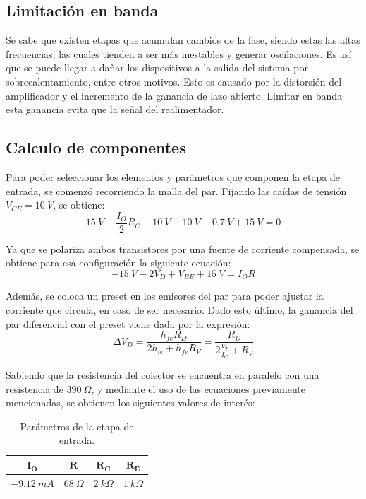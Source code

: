 \subsection{Limitación en banda}
Se sabe que  existen etapas que acumulan cambios de la fase, siendo estas las altas frecuencias, las cuales tienden a ser más inestables y generar oscilaciones. Es así que se puede llegar a dañar los dispositivos a la salida del sistema por sobrecalentamiento, entre otros motivos. Esto es causado por la distorsión del amplificador y el incremento de la ganancia de lazo abierto. Limitar en banda esta ganancia evita que la señal del realimentador.

\subsection{Calculo de componentes}
Para poder seleccionar los elementos y parámetros que componen la etapa de entrada, se comenzó recorriendo la malla del par. Fijando las caídas de tensión $V_{CE} = 10 \ V$, se obtiene:
\begin{equation}
	15 \ V - \frac{I_O}{2} R_C - 10 \ V - 10 \ V - 0.7 \ V + 15 \ V = 0
\end{equation}

Ya que se polariza ambos transistores por una fuente de corriente compensada, se obtiene para esa configuración la siguiente ecuación:
\begin{equation}
	-15 \ V - 2V_{D} + V_{BE} + 15 \ V = I_O R 
\end{equation}

Además, se coloca un preset en los emisores del par para poder ajustar la corriente que circula, en caso de ser necesario. Dado esto último, la ganancia del par diferencial con el preset viene dada por la expresión:
\begin{equation}
	\Delta V_D = \frac{h_{fe} R_D}{2 h_{ie} + h_{fe} R_V} = \frac{R_D}{2 \frac{V_T}{I_C} + R_V}
\end{equation}

Sabiendo que la resistencia del colector se encuentra en paralelo con una resistencia de $390 \ \Omega$, y mediante el uso de las ecuaciones previamente mencionadas, se obtienen los siguientes valores de interés:

\begin{table}[H]
\centering
\begin{tabular}{cccc}
\hline
$\mathbf{I_O}$ & $\mathbf{R}$  & $\mathbf{R_C}$ & $\mathbf{R_E}$ \\	\hline
$-9.12 \ mA$   & $68 \ \Omega$ & $2 \ k\Omega$  & $1 \ k\Omega$ \\
\hline
\end{tabular}
\caption{Parámetros de la etapa de entrada.}
\end{table}